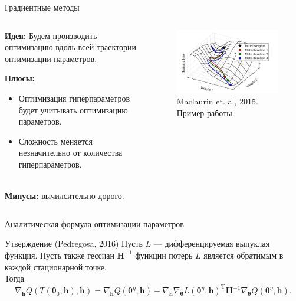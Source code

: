 \documentclass[usenames,dvipsnames,10pt,pdf,utf8,russian,aspectratio=43]{beamer}
\begin{document}
\begin{frame}{Градиентные методы}
\begin{columns}
\begin{column}{0.5\textwidth}
\textbf{Идея:}
Будем производить оптимизацию вдоль всей траектории оптимизации параметров.

\textbf{Плюсы:}
\begin{itemize}
\item Оптимизация гиперпараметров будет учитывать оптимизацию параметров.
\item Сложность меняется незначительно от количества гиперпараметров.
\end{itemize}

~\\
\textbf{Минусы:} вычилсительно дорого.

\end{column}
\begin{column}{0.4\textwidth}
\begin{figure}[h]
\includegraphics[width=\textwidth]{./grad.png}
\caption*{Maclaurin et. al, 2015. Пример работы.}
\end{figure}

\end{column}
\end{columns}

\end{frame}



\begin{frame}{Аналитическая формула оптимизации параметров}
\begin{block}{Утверждение (Pedregosa, 2016)}
Пусть $L$ --- дифференцируемая выпуклая функция.
Пусть также гессиан $\mathbf{H}^{-1}$ функции потерь $L$ является обратимым в каждой стационарной точке.\\
Тогда
\[
\nabla_{\mathbf{h}}Q(T(\boldsymbol{\theta}_0, \mathbf{h}), \mathbf{h}) =  \nabla_{\mathbf{h}}Q(\boldsymbol{\theta}^\eta, \mathbf{h}) - \nabla_{\mathbf{h}}\nabla_{\boldsymbol{\theta}} L(\boldsymbol{\theta}^\eta, \mathbf{h})^\text{T}\mathbf{H}^{-1}\nabla_{\boldsymbol{\theta}}Q(\boldsymbol{\theta}^\eta, \mathbf{h}).
\]
\end{block}

\end{frame}
\end{document}
